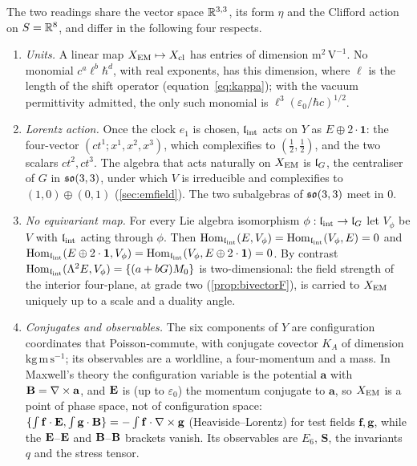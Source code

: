 \begin{theorem}
\label{r1:thm:type}
The two readings share the vector space $\mathbb{R}^{3,3}$, its form $\eta$ and the Clifford action on $S=\mathbb{R}^8$, and differ in the following
four respects.
\begin{enumerate}[label=(\roman*),leftmargin=2.2em]
\item \emph{Units.} A linear map $X_{\rm EM}\mapsto X_{\rm cl}$ has entries of dimension $\mathrm{m^2\,V^{-1}}$. No monomial
$c^a\ell^b\hbar^d$, with real exponents, has this dimension, where $\ell$ is the length of the shift operator (equation~\cref{eq:kappa}); with the vacuum permittivity admitted, the only such monomial is $\ell^3(\varepsilon_0/\hbar c)^{1/2}$.
\item \emph{Lorentz action.} Once the clock $e_1$ is chosen, $\mathfrak l_{\rm int}$ acts on $Y$ as $E\oplus2\cdot\mathbf1$: the four-vector
$(ct^1;x^1,x^2,x^3)$, which complexifies to $(\tfrac12,\tfrac12)$, and the two scalars $ct^2,ct^3$. The algebra that acts naturally on
$X_{\rm EM}$ is $\mathfrak l_G$, the centraliser of $G$ in $\mathfrak{so}(3,3)$, under which $V$ is irreducible and complexifies to $(1,0)\oplus(0,1)$
(\cref{sec:emfield}). The two subalgebras of $\mathfrak{so}(3,3)$ meet in $0$.
\item \emph{No equivariant map.} For every Lie algebra isomorphism $\phi:\mathfrak l_{\rm int}\to\mathfrak l_G$ let $V_\phi$ be $V$ with $\mathfrak l_{\rm int}$ acting through
$\phi$. Then $\operatorname{Hom}_{\mathfrak l_{\rm int}}(E,V_\phi)=\operatorname{Hom}_{\mathfrak l_{\rm int}}(V_\phi,E)=0$ and $\operatorname{Hom}_{\mathfrak l_{\rm int}}(E\oplus2\cdot\mathbf1,V_\phi)=\operatorname{Hom}_{\mathfrak l_{\rm int}}(V_\phi,E\oplus2\cdot\mathbf1)=0$.
By contrast $\operatorname{Hom}_{\mathfrak l_{\rm int}}(\Lambda^2E,V_\phi)=\{(a+bG)M_0\}$ is two-dimensional: the field strength of the interior four-plane, at
grade two (\cref{prop:bivectorF}), is carried to $X_{\rm EM}$ uniquely up to a scale and a duality angle.
\item \emph{Conjugates and observables.} The six components of $Y$ are configuration coordinates that Poisson-commute, with conjugate
covector $K_A$ of dimension $\mathrm{kg\,m\,s^{-1}}$; its observables are a worldline, a four-momentum and a mass. In Maxwell's theory the
configuration variable is the potential $\mathbf a$ with $\mathbf B=\nabla\times\mathbf a$, and $\mathbf E$ is (up to $\varepsilon_0$) the momentum conjugate
to $\mathbf a$, so $X_{\rm EM}$ is a point of phase space, not of configuration space: $\{\int\mathbf f\cdot\mathbf E,\int\mathbf g\cdot\mathbf B\}=-\int\mathbf
f\cdot\nabla\times\mathbf g$ (Heaviside--Lorentz) for test fields $\mathbf f,\mathbf g$, while the $\mathbf E$--$\mathbf E$ and $\mathbf B$--$\mathbf B$ brackets vanish. Its
observables are $E_6$, $\mathbf S$, the invariants $q$ and the stress tensor.
\end{enumerate}
\end{theorem}

